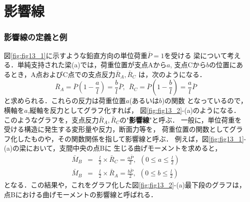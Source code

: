 \documentclass[10pt,a4j]{jbook}
\newlength{\minitwocolumn}
\begin{document}
\newcommand{\fat}[1]{\mbox{\boldmath $#1$}}
\newcommand{\D}{\partial}
\newcommand{\w}{\omega}
\newcommand{\ga}{\alpha}
\newcommand{\gb}{\beta}
\newcommand{\gx}{\xi}
\newcommand{\gz}{\zeta}
\newcommand{\vhat}[1]{\hat{\fat{#1}}}
\newcommand{\spc}{\vspace{0.7\baselineskip}}
\newcommand{\halfspc}{\vspace{0.3\baselineskip}}

\newcommand{\twofig}[2]
 {
   \begin{figure}
     \begin{minipage}[t]{\minitwocolumn}
         \begin{center}   #1
         \end{center}
     \end{minipage}
         \hspace{\columnsep}
     \begin{minipage}[t]{\minitwocolumn}
         \begin{center} #2
         \end{center}
     \end{minipage}
   \end{figure}
 }
\setcounter{chapter}{9}
\chapter{影響線}
\subsection{影響線の定義と例}
図\ref{fig:fig13_1}に示すような鉛直方向の単位荷重$\bar P=1$を受ける
梁について考える．単純支持された梁(a)では，荷重位置が支点Aから$a$,
支点Cから$b$の位置にあるとき，A点およびC点での支点反力$\bar{R}_A,\bar{R}_C$
は，次のようになる．
\begin{equation}
	\bar R_A =  \bar{P}\left( 1-\frac{a}{l}\right)
	=
	\frac{b}{l}
	\bar{P}
	, \ \ 
	\bar R_C =  \bar{P}\left( 1-\frac{b}{l}\right)
	= \frac{a}{l} \bar{P}
	\label{eqn:Rbar_1}
\end{equation}
と求められる．これらの反力は荷重位置$a$(あるいは$b$)の関数
となっているので，横軸を$a$,縦軸を反力としてグラフ化すれば，
図\ref{fig:fig13_2}-(a)のようになる．
このようなグラフを，支点反力$\bar{R}_A,\bar{R}_C$の"{\bf 影響線}"と呼ぶ．
一般に，単位荷重を受ける構造に発生する変形量や反力，断面力等を，
荷重位置の関数としてグラフ化したものや，その関数関係を指して影響線と呼ぶ．
例えば，図\ref{fig:fig13_1}-(a)の梁において，支間中央の点Bに
生じる曲げモーメントを求めると，
\begin{eqnarray}
	\bar{M}_B &=& \frac{l}{2}\times \bar{R}_C=\frac{a\bar P }{2}
	, \ \ \left( 0 \leq a \leq \frac{l}{2} \right) \\
	\bar{M}_B &=& \frac{l}{2}\times \bar{R}_A=\frac{b\bar P }{2}
	, \ \ \left( 0 \leq b \leq \frac{l}{2} \right) 
\end{eqnarray}
となる．この結果や，これをグラフ化した図\ref{fig:fig13_2}-(a)最下段のグラフは，
点Bにおける曲げモーメントの影響線と呼ばれる．
\end{document}
